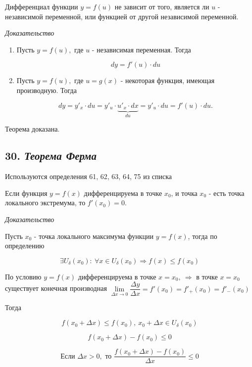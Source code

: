 Дифференциал функции $y = f(u)$ не зависит от того, является ли $u$ - независимой переменной, или функцией от другой независимой переменной.
\vspace*{20pt} 

\textit{Доказательство}
\begin{enumerate}

\item Пусть $y = f(u),$ где $u$ - независимая переменная. Тогда

$$dy = f'(u)\cdot du
    $$
\item Пусть $y = f(u),$ где $u = g(x)$ - некоторая функция, имеющая производную. Тогда

$$dy = y'_x\cdot du = y'_u\cdot \underbrace{u'_x \cdot dx}_{du} = y'_u\cdot du = f'(u) \cdot du.
    $$

\end{enumerate}

Теорема доказана.
\newpage 
\subsection*{30. \textit{Теорема Ферма}}
\begin{Quote2} 
\small\centering 

Используются определения 61, 62, 63, 64, 75 из списка \end{Quote2} 

Если функция $y = f(x)$ дифференцируема в точке $x_0$, и точка $x_0$ - есть точка локального экстремума, то $f'(x_0) = 0$.
\vspace*{20pt} 

\textit{Доказательство}

Пусть $x_0$ - точка локального максимума функции $y = f(x)$, тогда по определению

$$
\exists U_\delta(x_0) : \ \forall x \in U_\delta(x_0) \Rightarrow f(x) \leqslant f(x_0)
$$

По условию $y = f(x)$ дифференцируема в точке $x = x_0, \ \Rightarrow$ в точке $x = x_0$ существует конечная производная $\lim\limits_{\Delta x \rightarrow 0}{\dfrac{\Delta y}{\Delta x}} = f'(x_0) = f'_+(x_0) = f'_-(x_0)$

Тогда

$$
f(x_0 + \Delta x) \leqslant f(x_0), \ x_0 + \Delta x \in U_\delta(x_0)
$$

$$
f(x_0 + \Delta x) - f(x_0) \leqslant 0
$$

$$
\text{Если } \Delta x > 0, \text{ то } {\dfrac{f(x_0+\Delta x) - f(x_0)}{\Delta x}} \leqslant 0
$$

